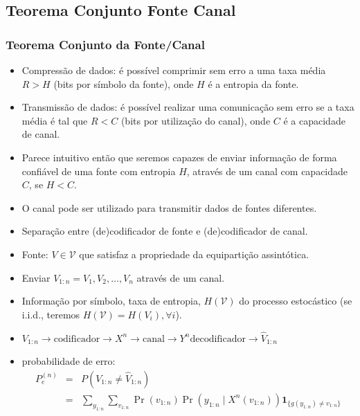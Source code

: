 \subsection{Teorema Conjunto Fonte Canal}
\begin{frame}[allowframebreaks]
  \frametitle{Teorema Conjunto da Fonte/Canal}

  \begin{itemize}
  \item Compressão de dados: é possível comprimir sem erro a uma taxa média $R > H$ (bits por símbolo da fonte), 
	onde $H$ é a entropia da fonte.
  \item Transmissão de dados: é possível realizar uma comunicação sem erro se a taxa média é tal que $R < C$ 
	(bits por utilização do canal), onde $C$ é a capacidade de canal.
  \item Parece intuitivo então que seremos capazes de enviar informação de forma confiável de uma fonte com
	entropia $H$, através de um canal com capacidade $C$, se $H<C$.
  \item O canal pode ser utilizado para transmitir dados de fontes diferentes.
  \item Separação entre (de)codificador de fonte e (de)codificador de canal.
  \end{itemize}

  \framebreak
 
  \begin{itemize}
  \item Fonte: $V \in \mathcal{V}$ que satisfaz a propriedade da equipartição assintótica.
  \item Enviar $V_{1:n} = V_1, V_2, \ldots, V_n$ através de um canal.
  \item Informação por símbolo, taxa de entropia, $H(\mathcal{V})$ do processo estocástico 
	(se i.i.d., teremos $H(\mathcal{V}) = H(V_i), \forall i$).
  \item $V_{1:n} \rightarrow \text{codificador} \rightarrow  X^n \rightarrow \text{canal} \rightarrow Y^n \text{decodificador} \rightarrow \hat{V}_{1:n}$
  \item probabilidade de erro:
	\begin{eqnarray}
	P_e^{(n)} &=& P(V_{1:n} \neq \hat{V}_{1:n}) \\
		&=& \sum_{y_{1:n}} \sum_{v_{1:n}} \Pr(v_{1:n}) \Pr(y_{1:n} \mid X^n( v_{1:n} )) \mathbf{1}_{\{ g(y_{1:n}) \neq v_{1:n} \}} \nonumber
	\end{eqnarray}
  \end{itemize}
  \framebreak


\end{frame}
